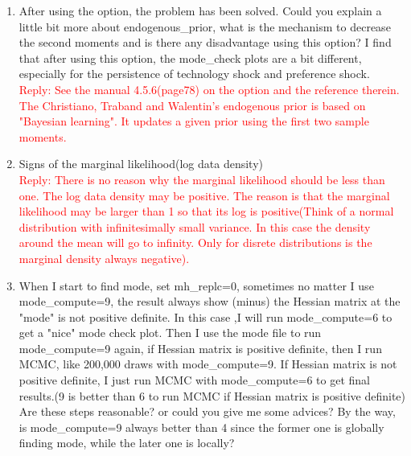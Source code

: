 \documentclass[10pt,math=newtx,citestyle=gb7714-2015,bibstyle=gb7714-2015]{elegantbook}
\begin{document}
{{{\begin{enumerate}
		$$y\_obs=y-y(-1)+y\_ME$$
		$$c\_obs=c-c(-1)+y\_ME$$
		$$i\_obs=i-i(-1)$$
		$$h\_obs=h$$
		The measurement equation for one-side HP  filtered data(cyclical component):
		$$y\_obs=y+y\_ME$$
		$$c\_obs=c$$
		$$i\_obs=i$$
		$$h\_obs=h$$
		both model second moments are much larger than corresponding data second0 moments.\\
		\textcolor{red}{Reply: Unfortunately, this is not entirely unheard of. In Born, Peter and Pfeifer(2013) "Fiscal news and macroeconomic volatility", they use the endogenous\_prior option for this reason. You should  try whether this helps. If yes, the actual estimation might be fine.}
		\item After using the option, the problem has been solved. Could you explain a little bit more about endogenous\_prior, what is the mechanism to decrease the second moments and is there any disadvantage using this option? I find that after using this option, the mode\_check plots are a bit different, especially for the persistence of technology shock and preference shock.\\
		\textcolor{red}{Reply: See the manual 4.5.6(page78) on the option and the reference therein. The Christiano, Traband and Walentin's endogenous prior is based on "Bayesian learning". It updates a given prior using the first two sample moments.}
		\item Signs of the marginal likelihood(log data density)\\
		\textcolor{red}{Reply: There is no reason why the marginal likelihood should be less than one. The log data density may be positive. The reason is that the marginal likelihood may be larger than 1 so that its log is positive(Think of a normal distribution with infinitesimally small variance. In this case the density around the mean will go to infinity. Only for disrete distributions is the marginal density always negative).}
		\item When I start to find mode, set mh\_replc=0, sometimes no matter I use mode\_compute=9, the result always show (minus) the Hessian matrix at the "mode" is not positive definite. In this case ,I will run mode\_compute=6 to get a "nice" mode check plot. Then I use the mode file to run mode\_compute=9 again, if Hessian matrix is positive definite, then I run MCMC, like 200,000 draws with mode\_compute=9. If Hessian matrix is not positive definite, I just run MCMC with mode\_compute=6 to get final results.(9 is better than 6 to run MCMC if Hessian matrix is positive definite) Are these steps reasonable? or could you give me some advices? By the way, is mode\_compute=9 always better than 4 since the former one is globally finding mode, while the later one is locally?\\

\end{enumerate}}}}
\end{document}

